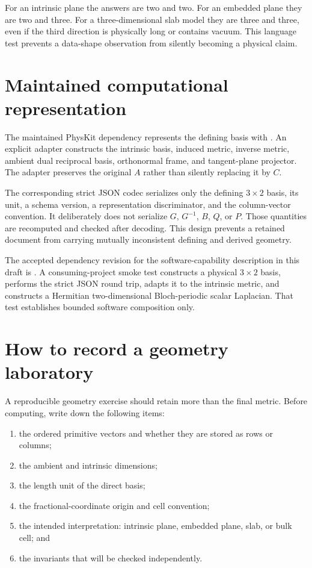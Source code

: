For an intrinsic plane the answers are two and two. For an embedded plane they
are two and three. For a three-dimensional slab model they are three and three,
even if the third direction is physically long or contains vacuum. This
language test prevents a data-shape observation from silently becoming a
physical claim.

\section{Maintained computational representation}

The maintained PhysKit dependency represents the defining basis with
. An explicit adapter constructs the intrinsic
basis, induced metric, inverse metric, ambient dual reciprocal basis,
orthonormal frame, and tangent-plane projector. The adapter preserves the
original $A$ rather than silently replacing it by $C$.

The corresponding strict JSON codec serializes only the defining $3\times2$
basis, its unit, a schema version, a representation discriminator, and the
column-vector convention. It deliberately does not serialize $G$, $G^{-1}$,
$B$, $Q$, or $P$. Those quantities are recomputed and checked after decoding.
This design prevents a retained document from carrying mutually inconsistent
defining and derived geometry.

The accepted dependency revision for the software-capability description in
this draft is
. A consuming-project smoke test
constructs a physical $3\times2$ basis, performs the strict JSON round trip,
adapts it to the intrinsic metric, and constructs a Hermitian two-dimensional
Bloch-periodic scalar Laplacian. That test establishes bounded software
composition only.

\section{How to record a geometry laboratory}

A reproducible geometry exercise should retain more than the final metric.
Before computing, write down the following items:

\begin{enumerate}
  \item the ordered primitive vectors and whether they are stored as rows or
        columns;
  \item the ambient and intrinsic dimensions;
  \item the length unit of the direct basis;
  \item the fractional-coordinate origin and cell convention;
  \item the intended interpretation: intrinsic plane, embedded plane, slab, or
        bulk cell; and
  \item the invariants that will be checked independently.
\end{enumerate}

